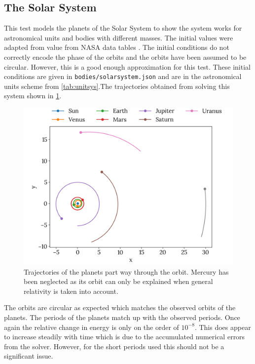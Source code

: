 \documentclass{physics_article_B}
\begin{document}
\subsection{The Solar System}
This test models the planets of the Solar System to show the system works for astronomical units and bodies with different masses. The initial values were adapted from value from NASA data tables \cite{noauthor_planetary_nodate}. The initial conditions do not correctly encode the phase of the orbits and the orbits have been assumed to be circular. However, this is a good enough approximation for this test. These initial conditions are given in \texttt{bodies/solarsystem.json} \cite{dudgeon_oliverdudgeon/nbody_2019} and are in the astronomical units scheme from \cref{tab:unitsys}.The trajectories obtained from solving this system shown in \cref{fig:solarsystem}.

\begin{figure}[h]
 \centering
 \includegraphics[width=1\linewidth]{solarsystem.png}
 \caption{Trajectories of the planets part way through the orbit. Mercury has been neglected as its orbit can only be explained when general relativity is taken into account. }
 \label{fig:solarsystem}
\end{figure}

The orbits are circular as expected which matches the observed orbits of the planets. The periods of the planets match up with the observed periods. Once again the relative change in energy is only on the order of $10^{-8}$. This does appear to increase steadily with time which is due to the accumulated numerical errors from the solver. However, for the short periods used this should not be a significant issue.
\end{document}
